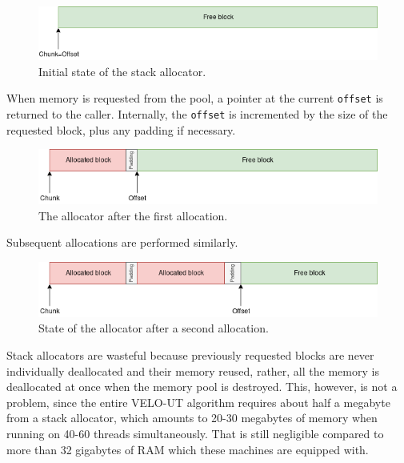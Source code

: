 \documentclass[12pt]{article}
\newcommand{\code}[1]{\texttt{#1}}
\begin{document}
\begin{figure}[H]
	\begin{center}
		\includegraphics[width=\textwidth]{velout_stack_allocator_initial}
	\end{center}
	\caption{Initial state of the stack allocator.}
	\label{fig_velout_stack_allocator_initial}
\end{figure}

When memory is requested from the pool, a pointer at the current \code{offset} is returned to the caller. Internally, the \code{offset} is incremented by the size of the requested block, plus any padding if necessary.

\begin{figure}[H]
	\begin{center}
		\includegraphics[width=\textwidth]{velout_stack_allocator_alloc1}
	\end{center}
	\caption{The allocator after the first allocation.}
	\label{fig_velout_stack_allocator_alloc1}
\end{figure}

Subsequent allocations are performed similarly.

\begin{figure}[H]
	\begin{center}
		\includegraphics[width=\textwidth]{velout_stack_allocator_alloc2}
	\end{center}
	\caption{State of the allocator after a second allocation.}
	\label{fig_velout_stack_allocator_alloc2}
\end{figure}

Stack allocators are wasteful because previously requested blocks are never individually deallocated and their memory reused, rather, all the memory is deallocated at once when the memory pool is destroyed. This, however, is not a problem, since the entire VELO-UT algorithm requires about half a megabyte from a stack allocator, which amounts to 20-30 megabytes of memory when running on 40-60 threads simultaneously. That is still negligible compared to more than 32 gigabytes of RAM which these machines are equipped with.
\end{document}
